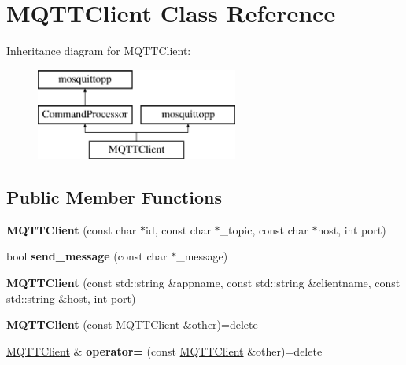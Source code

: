 \hypertarget{class_m_q_t_t_client}{}\section{M\+Q\+T\+T\+Client Class Reference}
\label{class_m_q_t_t_client}
Inheritance diagram for M\+Q\+T\+T\+Client\+:\begin{figure}[H]
\begin{center}
\leavevmode
\includegraphics[height=3.000000cm]{class_m_q_t_t_client}
\end{center}
\end{figure}
\subsection*{Public Member Functions}
\begin{DoxyCompactItemize}
\item 
\mbox{\label{class_m_q_t_t_client_a3d0d2bd786c6c4462902f2e427a98880}} 
{\bfseries M\+Q\+T\+T\+Client} (const char $\ast$id, const char $\ast$\+\_\+topic, const char $\ast$host, int port)
\item 
\mbox{\label{class_m_q_t_t_client_acc31f01cda9d547ee713f12e88a72724}} 
bool {\bfseries send\+\_\+message} (const char $\ast$\+\_\+message)
\item 
\mbox{\label{class_m_q_t_t_client_a7dd4122430ea7d07073a1ccae9603178}} 
{\bfseries M\+Q\+T\+T\+Client} (const std\+::string \&appname, const std\+::string \&clientname, const std\+::string \&host, int port)
\item 
\mbox{\label{class_m_q_t_t_client_a2ecf996b6b2ef01ae61fd20c1d127565}} 
{\bfseries M\+Q\+T\+T\+Client} (const \mbox{\hyperlink{class_m_q_t_t_client}{M\+Q\+T\+T\+Client}} \&other)=delete
\item 
\mbox{\label{class_m_q_t_t_client_a4ab4a3f10bb6d18bff6eac9caace7fc9}} 
\mbox{\hyperlink{class_m_q_t_t_client}{M\+Q\+T\+T\+Client}} \& {\bfseries operator=} (const \mbox{\hyperlink{class_m_q_t_t_client}{M\+Q\+T\+T\+Client}} \&other)=delete
\end{DoxyCompactItemize}
